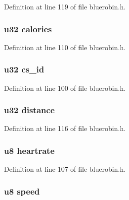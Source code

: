 \-Definition at line 119 of file bluerobin.\-h.

\hypertarget{structbr_ad2b1b631c0edcaa1b2dcd6408dc2513e}{
\subsubsection[{calories}]{\setlength{\rightskip}{0pt plus 5cm}u32 {\bf calories}}}\label{structbr_ad2b1b631c0edcaa1b2dcd6408dc2513e}


\-Definition at line 110 of file bluerobin.\-h.

\hypertarget{structbr_a263ffd4cf64b95e482bc27f852af2bef}{
\subsubsection[{cs\-\_\-id}]{\setlength{\rightskip}{0pt plus 5cm}u32 {\bf cs\-\_\-id}}}\label{structbr_a263ffd4cf64b95e482bc27f852af2bef}


\-Definition at line 100 of file bluerobin.\-h.

\hypertarget{structbr_ab5571a66c69793c55a165d01293371d4}{
\subsubsection[{distance}]{\setlength{\rightskip}{0pt plus 5cm}u32 {\bf distance}}}\label{structbr_ab5571a66c69793c55a165d01293371d4}


\-Definition at line 116 of file bluerobin.\-h.

\hypertarget{structbr_ad97e8f663ca7030a5b41d37c3966d882}{
\subsubsection[{heartrate}]{\setlength{\rightskip}{0pt plus 5cm}u8 {\bf heartrate}}}\label{structbr_ad97e8f663ca7030a5b41d37c3966d882}


\-Definition at line 107 of file bluerobin.\-h.

\hypertarget{structbr_a02f32f73f06efbe4be71730fb1995a24}{
\subsubsection[{speed}]{\setlength{\rightskip}{0pt plus 5cm}u8 {\bf speed}}}\label{structbr_a02f32f73f06efbe4be71730fb1995a24}


